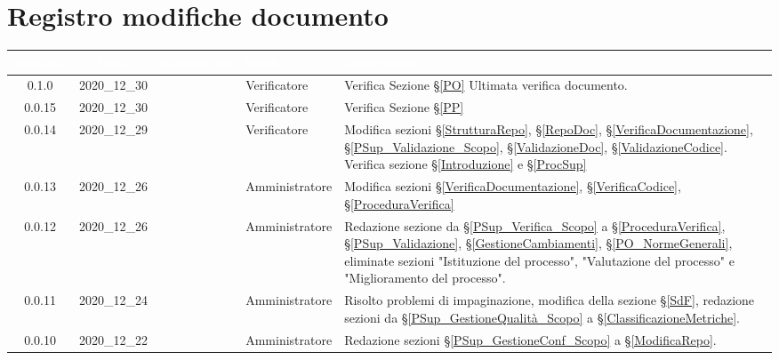 \section*{Registro modifiche documento}
{
\renewcommand{\arraystretch}{1.5}
\centering
\begin{longtable}{ c c  C{2.3cm} C{3cm} C{3.2cm}}


 \textcolor{white}{\textbf{Versione}}&
    \textcolor{white}{\textbf{Data}}&
    \textcolor{white}{\textbf{Nominativo}}&
    \textcolor{white}{\textbf{Ruolo}}&
    \textcolor{white}{\textbf{Descrizione}}\\	
    \endhead
    
    0.1.0 & 2020\_12\_30 & \MM{} & Verificatore & Verifica Sezione \S\ref{PO} Ultimata verifica documento.
    \\

    0.0.15 & 2020\_12\_30 & \TL{} & Verificatore & Verifica Sezione \S\ref{PP}
    \\

    0.0.14 & 2020\_12\_29 & \BL{} & Verificatore & Modifica sezioni \S\ref{StrutturaRepo}, \S\ref{RepoDoc}, \S\ref{VerificaDocumentazione}, \S\ref{PSup_Validazione_Scopo}, \S\ref{ValidazioneDoc}, \S\ref{ValidazioneCodice}. Verifica sezione \S\ref{Introduzione} e \S\ref{ProcSup} \\
    
    0.0.13 & 2020\_12\_26 & \TG{}  & Amministratore & Modifica sezioni \S\ref{VerificaDocumentazione}, \S\ref{VerificaCodice}, \S\ref{ProceduraVerifica} \\
    
      0.0.12 & 2020\_12\_26 & \TG{}  & Amministratore & Redazione sezione da \S\ref{PSup_Verifica_Scopo} a \S\ref{ProceduraVerifica}, \S\ref{PSup_Validazione}, \S\ref{GestioneCambiamenti}, \S\ref{PO_NormeGenerali}, eliminate sezioni "Istituzione del processo", "Valutazione del processo" e "Miglioramento del processo". \\
    
     0.0.11 & 2020\_12\_24 & \TG{}  & Amministratore & Risolto problemi di impaginazione, modifica della sezione \S\ref{SdF}, redazione sezioni da \S\ref{PSup_GestioneQualità_Scopo} a \S\ref{ClassificazioneMetriche}. \\
    
     0.0.10 & 2020\_12\_22 & \TG{}  & Amministratore & Redazione sezioni \S\ref{PSup_GestioneConf_Scopo} a \S\ref{ModificaRepo}. \\
    

\end{longtable}}

